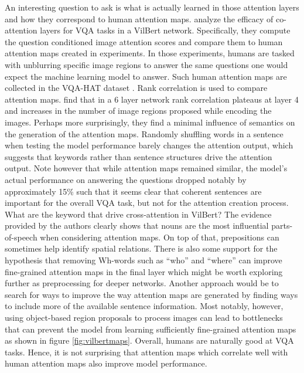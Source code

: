 \documentclass[
]{krantz}
\begin{document}
An interesting question to ask is what is actually learned in those attention layers and how they correspond to human attention maps. \citep{sikarwar2022efficacy} analyze the efficacy of co-attention layers for VQA tasks in a VilBert network. Specifically, they compute the question conditioned image attention scores and compare them to human attention maps created in experiments. In those experiments, humans are tasked with unblurring specific image regions to answer the same questions one would expect the machine learning model to answer. Such human attention maps are collected in the VQA-HAT dataset \citep{das2017human}. Rank correlation is used to compare attention maps. \citet{sikarwar2022efficacy} find that in a 6 layer network rank correlation plateaus at layer 4 and increases in the number of image regions proposed while encoding the images. Perhaps more surprisingly, they find a minimal influence of semantics on the generation of the attention maps. Randomly shuffling words in a sentence when testing the model performance barely changes the attention output, which suggests that keywords rather than sentence structures drive the attention output. Note however that while attention maps remained similar, the model's actual performance on answering the questions dropped notably by approximately 15\% such that it seems clear that coherent sentences are important for the overall VQA task, but not for the attention creation process. What are the keyword that drive cross-attention in VilBert? The evidence provided by the authors clearly shows that nouns are the most influential parts-of-speech when considering attention maps. On top of that, prepositions can sometimes help identify spatial relations. There is also some support for the hypothesis that removing Wh-words such as ``who'' and ``where'' can improve fine-grained attention maps in the final layer which might be worth exploring further as preprocessing for deeper networks. Another approach would be to search for ways to improve the way attention maps are generated by finding ways to include more of the available sentence information. Most notably, however, using object-based region proposals to process images can lead to bottlenecks that can prevent the model from learning sufficiently fine-grained attention maps as shown in figure \ref{fig:vilbertmaps}. Overall, humans are naturally good at VQA tasks. Hence, it is not surprising that attention maps which correlate well with human attention maps also improve model performance.
\end{document}
